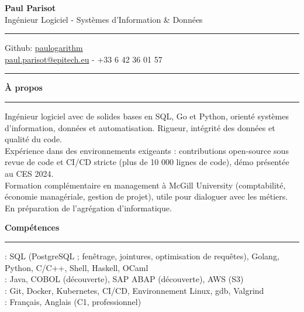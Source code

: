 \documentclass[9pt]{extarticle}
\begin{document}
\begin{center}
	{\huge\bfseries Paul Parisot}
	\\[9pt]
	{\Large Ingénieur Logiciel - Systèmes d'Information \& Données}
	\\
\end{center}

\par\vspace{-5pt}
\rule{\linewidth}{0.4pt}
\par\vspace{-5pt}

\begin{center}
	Github: \href{https://github.com/paulogarithm}{paulogarithm}
	\\
	\href{mailto:paul.parisot@epitech.eu}{paul.parisot@epitech.eu} - +33 6 42 36 01 57
	\\
\end{center}

\par\vspace{-10pt}
\rule{\linewidth}{0.4pt}
\par\vspace{7pt}

{\large\bfseries À propos}
\par\vspace{-8pt}
\rule{\linewidth}{0.4pt}
\par\vspace{5pt}

Ingénieur logiciel avec de solides bases en SQL, Go et Python, orienté systèmes d'information, données et automatisation. Rigueur, intégrité des données et qualité du code.
\\
Expérience dans des environnements exigeants : contributions open-source sous revue de code et CI/CD stricte (plus de 10 000 lignes de code), démo présentée au CES 2024.
\\
Formation complémentaire en management à McGill University (comptabilité, économie managériale, gestion de projet), utile pour dialoguer avec les métiers. En préparation de l'agrégation d'informatique.
\par\vspace{5pt}

{\large\bfseries Compétences}
\par\vspace{-8pt}
\rule{\linewidth}{0.4pt}
\par\vspace{5pt}

\hspace*{5pt}{\bfseries Maîtrise}: SQL (PostgreSQL ; fenêtrage, jointures, optimisation de requêtes), Golang, Python, C/C++, Shell, Haskell, OCaml
\\
\hspace*{5pt}{\bfseries Notions}: Java, COBOL (découverte), SAP ABAP (découverte), AWS (S3)
\\
\hspace*{5pt}{\bfseries Outils}: Git, Docker, Kubernetes, CI/CD, Environnement Linux, gdb, Valgrind
\\
\hspace*{5pt}{\bfseries Langues}: Français, Anglais (C1, professionnel)
\end{document}
